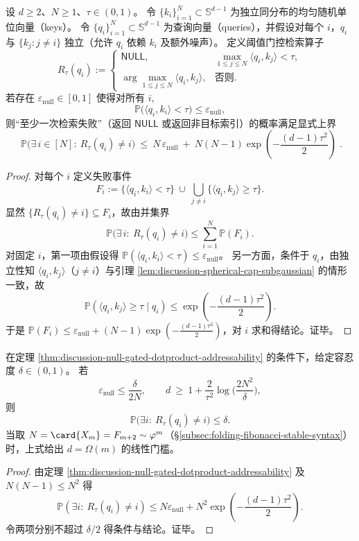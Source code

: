 \begin{theorem}[阈值门控点积检索的双预算上界]\label{thm:discussion-null-gated-dotproduct-addressability}
设 \(d\ge 2\)、\(N\ge 1\)、\(\tau\in(0,1)\)。
令 \(\{k_i\}_{i=1}^{N}\subset\mathbb{S}^{d-1}\) 为独立同分布的均匀随机单位向量（keys）。
令 \(\{q_i\}_{i=1}^{N}\subset\mathbb{S}^{d-1}\) 为查询向量（queries），并假设对每个 \(i\)，\(q_i\) 与 \(\{k_j:j\neq i\}\) 独立（允许 \(q_i\) 依赖 \(k_i\) 及额外噪声）。
定义阈值门控检索算子
\[
R_{\tau}(q_i):=
\begin{cases}
\mathsf{NULL}, & \max_{1\le j\le N}\langle q_i,k_j\rangle<\tau,\\
\arg\max_{1\le j\le N}\langle q_i,k_j\rangle, & \text{否则}.
\end{cases}
\]
若存在 \(\varepsilon_{\mathrm{null}}\in[0,1]\) 使得对所有 \(i\),
\[
\mathbb{P}\bigl(\langle q_i,k_i\rangle<\tau\bigr)\le \varepsilon_{\mathrm{null}},
\]
则“至少一次检索失败”（返回 \(\mathsf{NULL}\) 或返回非目标索引）的概率满足显式上界
\[
\boxed{\;
\mathbb{P}\Big(\exists\, i\in[N]:\ R_{\tau}(q_i)\neq i\Big)
\ \le\
N\,\varepsilon_{\mathrm{null}}
\ +\
N(N-1)\exp\!\left(-\frac{(d-1)\tau^2}{2}\right)\; }.
\]
\end{theorem}
\begin{proof}
对每个 \(i\) 定义失败事件
\[
F_i:=\{\langle q_i,k_i\rangle<\tau\}\ \cup\ \bigcup_{j\neq i}\{\langle q_i,k_j\rangle\ge \tau\}.
\]
显然 \(\{R_{\tau}(q_i)\neq i\}\subseteq F_i\)，故由并集界
\[
\mathbb{P}\Big(\exists\, i:\ R_{\tau}(q_i)\neq i\Big)\le \sum_{i=1}^{N}\mathbb{P}(F_i).
\]
对固定 \(i\)，第一项由假设得 \(\mathbb{P}(\langle q_i,k_i\rangle<\tau)\le \varepsilon_{\mathrm{null}}\)。
另一方面，条件于 \(q_i\)，由独立性知 \(\langle q_i,k_j\rangle\)（\(j\neq i\)）与引理 \ref{lem:discussion-spherical-cap-subgaussian} 的情形一致，故
\[
\mathbb{P}(\langle q_i,k_j\rangle\ge \tau\mid q_i)\le \exp\!\left(-\frac{(d-1)\tau^2}{2}\right).
\]
于是 \(\mathbb{P}(F_i)\le \varepsilon_{\mathrm{null}}+(N-1)\exp(-\frac{(d-1)\tau^2}{2})\)，对 \(i\) 求和得结论。证毕。
\end{proof}

\begin{corollary}\label{cor:discussion-null-gated-dotproduct-min-d}
在定理 \ref{thm:discussion-null-gated-dotproduct-addressability} 的条件下，给定容忍度 \(\delta\in(0,1)\)。
若
\[
\varepsilon_{\mathrm{null}}\le \frac{\delta}{2N},
\qquad
d\ \ge\ 1+\frac{2}{\tau^2}\log\!\Big(\frac{2N^2}{\delta}\Big),
\]
则
\[
\mathbb{P}\bigl(\exists i:\ R_\tau(q_i)\neq i\bigr)\le \delta.
\]
当取 \(N=\card{X_m}=F_{m+2}\sim \varphi^m\)（\S\ref{subsec:folding-fibonacci-stable-syntax}）时，上式给出 \(d=\Omega(m)\) 的线性门槛。
\end{corollary}
\begin{proof}
由定理 \ref{thm:discussion-null-gated-dotproduct-addressability} 及 \(N(N-1)\le N^2\) 得
\[
\mathbb{P}(\exists i:\ R_\tau(q_i)\neq i)\le N\varepsilon_{\mathrm{null}}+N^2\exp\!\left(-\frac{(d-1)\tau^2}{2}\right).
\]
令两项分别不超过 \(\delta/2\) 得条件与结论。证毕。
\end{proof}

